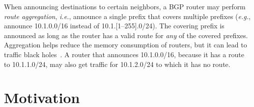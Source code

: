 \documentclass[numbers, 10pt]{sigplanconf}
\newcommand{\EG}{\emph{e.g.}}
\newcommand{\IE}{\emph{i.e.}}
\begin{document}
When announcing destinations to certain neighbors, a BGP router may perform {\em route aggregation}, \IE, announce a single prefix that covers multiple prefixes (\EG, announce 10.1.0.0/16 instead of 10.1.[1--255].0/24). The covering prefix is announced as long as the router has a valid route for {\em any} of the covered prefixes. Aggregation helps reduce the memory consumption of routers, but it can lead to traffic black holes~\cite{route-aggregation}. A router that announces 10.1.0.0/16, because it has a route to 10.1.1.0/24, may also get traffic for 10.1.2.0/24 to which it has no route.






\section{Motivation}
\label{sec:motivation}
\end{document}

